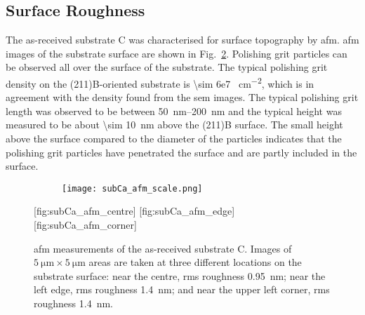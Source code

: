 \subsection{Surface Roughness}
The as-received substrate C was characterised for surface topography by \ac{afm}. \Ac{afm} images of the substrate surface are shown in Fig.~\ref{fig:subCa_afm}. Polishing grit particles can be observed all over the surface of the substrate. The typical polishing grit density on the (211)B-oriented substrate is \SI{\sim 6e7 }{\centi\metre^{-2}}, which is in agreement with the density found from the \ac{sem} images. The typical polishing grit length was observed to be between \SIrange{50}{200}{\nano\metre} and the typical height was measured to be about \SI{\sim 10}{\nano\metre} above the (211)B surface. The small height above the surface compared to the diameter of the particles indicates that the polishing grit particles have penetrated the surface and are partly included in the surface.

\begin{figure}[htbp]
    \centering
    \begin{subfigure}[c]{0.032\linewidth}
        \label{fig:subCa_afm_scale}\captionsetup{list=no}
        \texttt{[image: subCa\_afm\_scale.png]}
    \end{subfigure}
    \hfill
    [fig:subCa_afm_centre]%
    \hfill
    [fig:subCa_afm_edge]%
    \hfill
    [fig:subCa_afm_corner]%
    \caption[\Ac{afm} of as-received substrate C.]{\Ac{afm} measurements of the as-received substrate C. Images of $\SI{5}{\micro\metre}\times\SI{5}{\micro\metre}$ areas are taken at three different locations on the substrate surface:  near the centre, \ac{rms} roughness \SI{0.95}{\nano\metre};  near the left edge, \ac{rms} roughness \SI{1.4}{\nano\metre}; and  near the upper left corner, \ac{rms} roughness \SI{1.4}{\nano\metre}.}
    \label{fig:subCa_afm}
\end{figure} %


